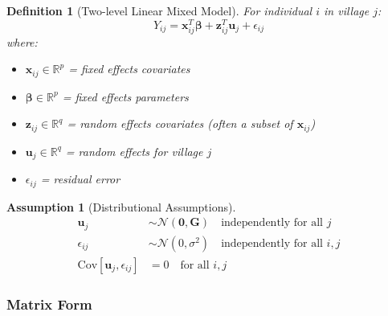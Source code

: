 \documentclass{article}
\newtheorem{definition}{Definition}
\newtheorem{assumption}{Assumption}
\begin{document}
\begin{definition}[Two-level Linear Mixed Model]
For individual $i$ in village $j$:
\begin{equation}
Y_{ij} = \mathbf{x}_{ij}^T\boldsymbol{\beta} + \mathbf{z}_{ij}^T\mathbf{u}_j + \epsilon_{ij}
\end{equation}
where:
\begin{itemize}
    \item $\mathbf{x}_{ij} \in \mathbb{R}^p$ = fixed effects covariates
    \item $\boldsymbol{\beta} \in \mathbb{R}^p$ = fixed effects parameters
    \item $\mathbf{z}_{ij} \in \mathbb{R}^q$ = random effects covariates (often a subset of $\mathbf{x}_{ij}$)
    \item $\mathbf{u}_j \in \mathbb{R}^q$ = random effects for village $j$
    \item $\epsilon_{ij}$ = residual error
\end{itemize}
\end{definition}

\begin{assumption}[Distributional Assumptions]
\begin{align}
\mathbf{u}_j &\sim \mathcal{N}(\mathbf{0}, \mathbf{G}) \quad \text{independently for all } j \\
\epsilon_{ij} &\sim \mathcal{N}(0, \sigma^2) \quad \text{independently for all } i,j \\
\text{Cov}[\mathbf{u}_j, \epsilon_{ij}] &= 0 \quad \text{for all } i,j
\end{align}
\end{assumption}

\subsubsection{Matrix Form}
\end{document}
